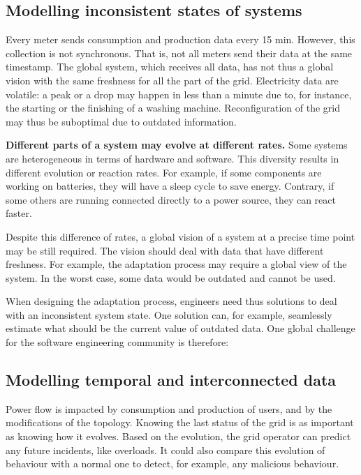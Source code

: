 \subsection{Modelling inconsistent states of systems}
Every meter sends consumption and production data every 15 min.
However, this collection is not synchronous.
That is, not all meters send their data at the same timestamp.
The global system, which receives all data, has not thus a global vision with the same freshness for all the part of the grid.
Electricity data are volatile: a peak or a drop may happen in less than a minute due to, for instance, the starting or the finishing of a washing machine.
Reconfiguration of the grid may thus be suboptimal due to outdated information.

\textbf{Different parts of a system may evolve at different rates.}
Some systems are heterogeneous in terms of hardware and software.
This diversity results in different evolution or reaction rates.
For example, if some components are working on batteries, they will have a sleep cycle to save energy.
Contrary, if some others are running connected directly to a power source, they can react faster.

Despite this difference of rates, a global vision of a system at a precise time point may be still required.
The vision should deal with data that have different freshness.
For example, the adaptation process may require a global view of the system.
In the worst case, some data would be outdated and cannot be used.

When designing the adaptation process, engineers need thus solutions to deal with an inconsistent system state.
One solution can, for example, seamlessly estimate what should be the current value of outdated data.
One global challenge for the software engineering community is therefore:
\vspace{-2em}


\subsection{Modelling temporal and interconnected data}
Power flow is impacted by consumption and production of users, and by the modifications of the topology.
Knowing the last status of the grid is as important as knowing how it evolves.
Based on the evolution, the grid operator can predict any future incidents, like overloads.
It could also compare this evolution of behaviour with a normal one to detect, for example, any malicious behaviour.

